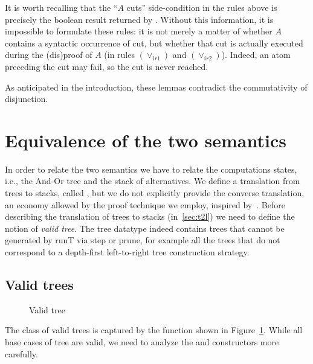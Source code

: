 It is worth recalling that the ``$A$ cuts'' side-condition in the rules above is
precisely the boolean result returned by \runT. Without this information, it is
impossible to formulate these rules: it is not merely a matter of whether $A$
contains a syntactic occurrence of cut, but whether that cut is actually
executed during the (dis)proof of $A$ (in rules $(\lor_{ir1})$ and $(\lor_{ir2})$).
Indeed, an atom preceding the cut may fail, so the cut is never reached.

As anticipated in the introduction, these lemmas contradict the commutativity of
disjunction.



\section{Equivalence of the two semantics}
\label{equiv}

In order to relate the two semantics we have to relate the computations states,
i.e., the And-Or tree and the stack of alternatives. We define a translation from trees to stacks, called \ttl, but
we do not explicitly provide the converse translation, an economy
allowed by the proof technique we employ, inspired by~\cite{yves-equiv}.
Before describing the translation of trees to stacks (in~\cref{sec:t2l})
we need to define the notion of \emph{valid tree}. The {tree}
datatype indeed contains trees that cannot be generated
by {runT} via {step} or {prune}, for example
all the trees that do not correspond to a depth-first left-to-right
tree construction strategy. 



\subsection{Valid trees}\label{sec:validtree}
\begin{figure}[b]
    
    \caption{Valid tree \label{fig:vt} }
\end{figure}


The class of valid trees is captured by the \vast
function shown in Figure~\ref{fig:vt}.
While all base cases of {tree} are valid, we need to analyze the \orC and
\andC constructors more carefully.

